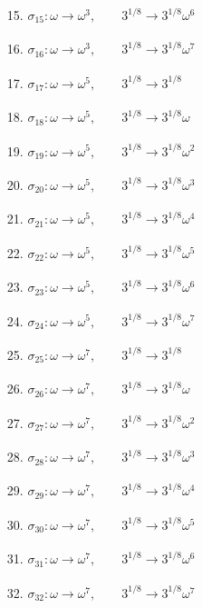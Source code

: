 \documentclass[12pt]{article}
\newcommand{\xmapsto}[2][]{\xrightarrow[#1]{#2}}
\begin{document}
\begin{enumerate}
\begin{enumerate}
        \item[15. ] $\sigma_{15}: \omega \xmapsto{} \omega^3,\qquad 3^{1/8} \xmapsto{} 3^{1/8}\omega^6$
        \item[16. ] $\sigma_{16}: \omega \xmapsto{} \omega^3,\qquad 3^{1/8} \xmapsto{} 3^{1/8}\omega^7$
        \item[17. ] $\sigma_{17}: \omega \xmapsto{} \omega^5,\qquad 3^{1/8} \xmapsto{} 3^{1/8}$
        \item[18. ] $\sigma_{18}: \omega \xmapsto{} \omega^5,\qquad 3^{1/8} \xmapsto{} 3^{1/8}\omega$
        \item[19. ] $\sigma_{19}: \omega \xmapsto{} \omega^5,\qquad 3^{1/8} \xmapsto{} 3^{1/8}\omega^2$
        \item[20. ] $\sigma_{20}: \omega \xmapsto{} \omega^5,\qquad 3^{1/8} \xmapsto{} 3^{1/8}\omega^3$
        \item[21. ] $\sigma_{21}: \omega \xmapsto{} \omega^5,\qquad 3^{1/8} \xmapsto{} 3^{1/8}\omega^4$
        \item[22. ] $\sigma_{22}: \omega \xmapsto{} \omega^5,\qquad 3^{1/8} \xmapsto{} 3^{1/8}\omega^5$
        \item[23. ] $\sigma_{23}: \omega \xmapsto{} \omega^5,\qquad 3^{1/8} \xmapsto{} 3^{1/8}\omega^6$
        \item[24. ] $\sigma_{24}: \omega \xmapsto{} \omega^5,\qquad 3^{1/8} \xmapsto{} 3^{1/8}\omega^7$
        \item[25. ] $\sigma_{25}: \omega \xmapsto{} \omega^7,\qquad 3^{1/8} \xmapsto{} 3^{1/8}$
        \item[26. ] $\sigma_{26}: \omega \xmapsto{} \omega^7,\qquad 3^{1/8} \xmapsto{} 3^{1/8}\omega$
        \item[27. ] $\sigma_{27}: \omega \xmapsto{} \omega^7,\qquad 3^{1/8} \xmapsto{} 3^{1/8}\omega^2$
        \item[28. ] $\sigma_{28}: \omega \xmapsto{} \omega^7,\qquad 3^{1/8} \xmapsto{} 3^{1/8}\omega^3$
        \item[29. ] $\sigma_{29}: \omega \xmapsto{} \omega^7,\qquad 3^{1/8} \xmapsto{} 3^{1/8}\omega^4$
        \item[30. ] $\sigma_{30}: \omega \xmapsto{} \omega^7,\qquad 3^{1/8} \xmapsto{} 3^{1/8}\omega^5$
        \item[31. ] $\sigma_{31}: \omega \xmapsto{} \omega^7,\qquad 3^{1/8} \xmapsto{} 3^{1/8}\omega^6$
        \item[32. ] $\sigma_{32}: \omega \xmapsto{} \omega^7,\qquad 3^{1/8} \xmapsto{} 3^{1/8}\omega^7$
    

\end{enumerate}
\end{enumerate}
\end{document}
